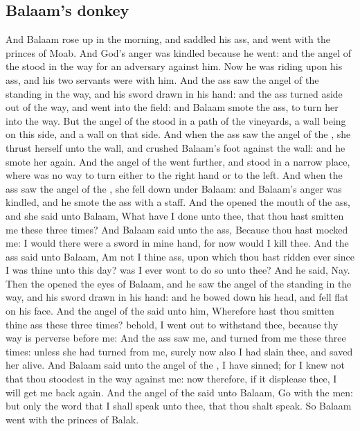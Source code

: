 \begin{biblechapter}
\section*{Balaam's donkey}
\verse And Balaam rose up in the morning, and saddled his ass, and went with the princes of Moab.
\verse And God's anger was kindled because he went: and the angel of the \LORD stood in the way for an adversary against him. Now he was riding upon his ass, and his two servants were with him.
\verse And the ass saw the angel of the \LORD standing in the way, and his sword drawn in his hand: and the ass turned aside out of the way, and went into the field: and Balaam smote the ass, to turn her into the way.
\verse But the angel of the \LORD stood in a path of the vineyards, a wall being on this side, and a wall on that side.
\verse And when the ass saw the angel of the \LORD, she thrust herself unto the wall, and crushed Balaam's foot against the wall: and he smote her again.
\verse And the angel of the \LORD went further, and stood in a narrow place, where was no way to turn either to the right hand or to the left.
\verse And when the ass saw the angel of the \LORD, she fell down under Balaam: and Balaam's anger was kindled, and he smote the ass with a staff.
\verse And the \LORD opened the mouth of the ass, and she said unto Balaam, What have I done unto thee, that thou hast smitten me these three times?
\verse And Balaam said unto the ass, Because thou hast mocked me: I would there were a sword in mine hand, for now would I kill thee.
\verse And the ass said unto Balaam, Am not I thine ass, upon which thou hast ridden ever since I was thine unto this day? was I ever wont to do so unto thee? And he said, Nay.
\verse Then the \LORD opened the eyes of Balaam, and he saw the angel of the \LORD standing in the way, and his sword drawn in his hand: and he bowed down his head, and fell flat on his face.
\verse And the angel of the \LORD said unto him, Wherefore hast thou smitten thine ass these three times? behold, I went out to withstand thee, because thy way is perverse before me:
\verse And the ass saw me, and turned from me these three times: unless she had turned from me, surely now also I had slain thee, and saved her alive.
\verse And Balaam said unto the angel of the \LORD, I have sinned; for I knew not that thou stoodest in the way against me: now therefore, if it displease thee, I will get me back again.
\verse And the angel of the \LORD said unto Balaam, Go with the men: but only the word that I shall speak unto thee, that thou shalt speak. So Balaam went with the princes of Balak.

\end{biblechapter}
